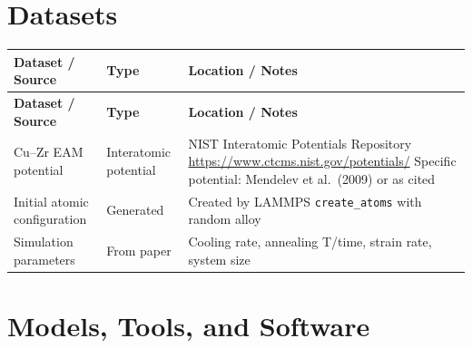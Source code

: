 \documentclass[11pt,a4paper]{article}
\begin{document}
\section{Datasets}

\begin{longtable}{p{4.5cm} p{3.5cm} p{6cm}}
\toprule
\textbf{Dataset / Source} & \textbf{Type} & \textbf{Location / Notes} \\
\midrule
\endfirsthead
\toprule
\textbf{Dataset / Source} & \textbf{Type} & \textbf{Location / Notes} \\
\midrule
\endhead
Cu--Zr EAM potential & Interatomic potential & NIST Interatomic Potentials Repository \newline \url{https://www.ctcms.nist.gov/potentials/} \newline Specific potential: Mendelev et al.\ (2009) or as cited \\
\midrule
Initial atomic configuration & Generated & Created by LAMMPS \texttt{create\_atoms} with random alloy \\
\midrule
Simulation parameters & From paper & Cooling rate, annealing T/time, strain rate, system size \\
\bottomrule
\end{longtable}

\section{Models, Tools, and Software}
\end{document}

